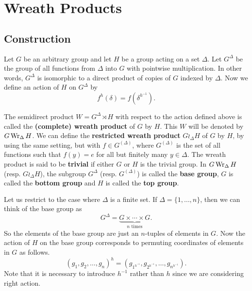 \section{Wreath Products}
\subsection{Construction}
Let $G$ be an arbitrary group and let $H$ be a group acting on a set $\Delta$. Let $G^\Delta$ be the group of all functions from $\Delta$ into $G$ with pointwise multiplication. In other words,  $G^\Delta$ is isomorphic to a direct product of copies of $G$ indexed by $\Delta$. Now we define an action of $H$ on  $G^\Delta$ by 
\begin{equation*}
	f^h(\delta) = f(\delta^{h^{-1}}).
\end{equation*}
\begin{definition}
	The semidirect product $W = G^\Delta \rtimes H$ with respect to the action defined above  is called the \textbf{(complete) wreath product} of $G$ by $H$. This $W$ will be denoted by $G \operatorname{Wr}_{\Delta} H$. We can define the \textbf{restricted wreath product} $G \wr_{\Delta} H$ of $G$ by $H$, by using the same setting, but with $f\in G^{(\Delta)}$, where $G^{(\Delta)}$ is the set of all functions such that $f(y) = e$ for all but finitely many $y\in \Delta$. The wreath product is said to be \textbf{trivial} if either $G$ or $H$ is the trivial group. In $G\operatorname{Wr}_\Delta H$ (resp. $G\wr_\Delta H$), the subgroup $G^\Delta$ (resp. $G^{(\Delta)}$) is called the \textbf{base group}, $G$ is called the \textbf{bottom group} and $H$ is called the \textbf{top group}.
\end{definition}

\begin{remark}
	Let us restrict to the case where $\Delta$ is a finite set. If $\Delta = \{1,\dots,n\}$, then we can think of the base group as $$G^\Delta = \underbrace{G\times \cdots \times G}_{n\text{ times}}.$$
	So the elements of the base group are just an $n$-tuples of elements in $G$. Now the action of $H$ on the base group corresponds to permuting coordinates of elements in $G$ as follows.
	\begin{equation*}
		(g_1,g_2,\dots, g_n)^h = (g_{1^{h^{-1}}},g_{2^{h^{-1}}},\dots, g_{n^{h^{-1}}}).
	\end{equation*}
	Note that it is necessary to introduce $h^{-1}$ rather than $h$ since we are considering right action.
\end{remark}



